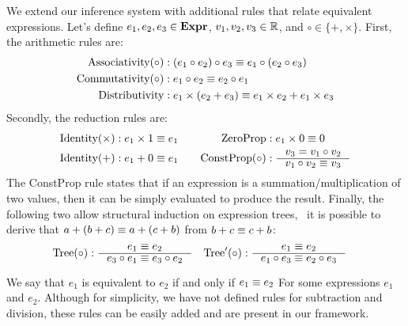 We extend our inference system with additional rules that relate equivalent
expressions.  Let's define $e_1, e_2, e_3 \in \mathbf{Expr}$, $v_1, v_2, v_3 \in
\mathbb{R}$, and $\circ \in \{+, \times\}$.  First, the arithmetic rules are:
\begin{equation*}
    \begin{aligned}
        \text{Associativity}(\circ)
            &: (e_1 \circ e_2) \circ e_3 \equiv e_1 \circ (e_2 \circ e_3) \\
        \text{Commutativity}(\circ)
            &: e_1 \circ e_2 \equiv e_2 \circ e_1 \\
        \text{Distributivity}
            &: e_1 \times (e_2 + e_3) \equiv e_1 \times e_2 + e_1 \times e_3
    \end{aligned}
\end{equation*}
Secondly, the reduction rules are:
\begin{equation*}
    \begin{aligned}
        \text{Identity}(\times)
            &: e_1 \times 1 \eqrel e_1 \quad &
        \text{ZeroProp}
            &: e_1 \times 0 \eqrel 0 \\
        \text{Identity}(+)
            &: e_1 + 0 \eqrel e_1 &
        \text{ConstProp}(\circ)
            &: \inference{v_3 = v_1 \circ v_2}{v_1 \circ v_2 \eqrel v_3}
    \end{aligned}
\end{equation*}
The ConstProp rule states that if an expression is a summation/multiplication
of two values, then it can be simply evaluated to produce the result. Finally,
the following two allow structural induction on expression trees, \ie~it is
possible to derive that $a + (b + c) \equiv a + (c + b)$ from $b + c \equiv c +
b$:
\begin{equation}
    \begin{aligned}
        \text{Tree}(\circ)
            : \inference{e_1 \eqrel e_2}{e_3 \circ e_1 \eqrel e_3 \circ e_2}
        \quad &
        \text{Tree}^\prime(\circ)
            : \inference{e_1 \eqrel e_2}{e_1 \circ e_3 \eqrel e_2 \circ e_3}
    \end{aligned}
    \label{eq:equivalence_inference}
\end{equation}

We say that $e_1$ is equivalent to $e_2$ if and only if $e_1 \equiv e_2$ For
some expressions $e_1$ and $e_2$.  Although for simplicity, we have not defined
rules for subtraction and division, these rules can be easily added and are
present in our framework.


